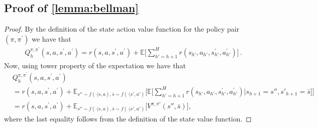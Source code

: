 \subsection{Proof of \cref{lemma:bellman}}
\label{proof:bellmam}
\begin{proof}
By the definition of the state action value function for the policy pair 
$(\pi,\pi^\prime)$
we have that 
\begin{equation*}
\begin{split}
& Q^{\pi,\pi^\prime}_h(s,a,s^\prime,a^\prime) = 
r(s,a,s^\prime,a^\prime)
+
\mathbb{E}
\Big[ 
\sum_{h'=h+1}^{H}  r(s_{h'},a_{h'},s_{h'}^\prime,a_{h'}^\prime)
\Big]
\,.
\end{split}
\end{equation*}
Now, using tower property of the expectation we have that
\begin{align*}
&Q_h^{\pi,\pi^\prime}(s,a,s^\prime,a^\prime) \\
&= 
r(s,a,s^\prime,a^\prime)
+
\mathbb{E}_{s''\sim f(\cdot|s,a),\bar{s}\sim f(\cdot|s',a')}\Big[\mathbb{E}
\Big[ 
\sum_{h'=h+1}^{H} r(s_{h'},a_{h'},s_{h'}^\prime,a_{h'}^\prime) | s_{h+1} = s'', s'_{h+1} = \bar{s}
\Big]\Big]
\\
&=
r(s,a,s^\prime,a^\prime)
+
 \mathbb{E}_{s''\sim f(\cdot|s,a),\bar{s}\sim f(\cdot|s',a')}\Big[V^{\pi,\pi'}(s'',\bar{s})\Big],
\end{align*}
where the last equality follows from the definition of the state value function.
\end{proof}


